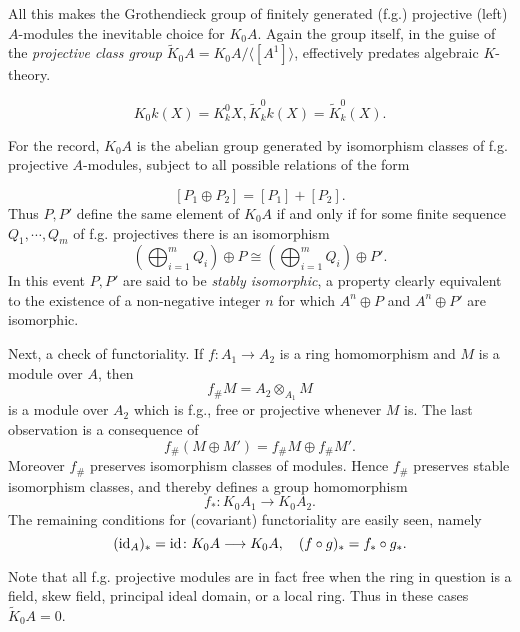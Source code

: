 All this makes the Grothendieck group of finitely generated (f.g.) projective (left) $A$-modules the inevitable choice for $K_0A$. Again the group itself, in the guise of the {\em projective class group}
$\widetilde{K}_0A=K_0A/\langle [A^1] \rangle$, effectively predates algebraic $K$-theory.
\begin{corollary}
$$K_0k(X)=K_k^0X,\widetilde{K}_k^0k(X)=\widetilde{K}_k^0(X).$$
\end{corollary}

For the record, $K_0A$ is the abelian group generated by isomorphism classes of f.g. projective $A$-modules, subject to all possible relations of the form

$$[P_1\oplus P_2]=[P_1]+[P_2].$$
Thus $P,P'$ define the same element of $K_0A$ if and only if for some finite sequence $Q_1,\cdots,Q_m$ of f.g. projectives there is an isomorphism
\[(\bigoplus_{i=1}^m Q_i)\oplus P \cong (\bigoplus_{i=1}^m Q_i)\oplus P' .\]
In this event $P,P'$ are said to be {\em stably isomorphic}, a property clearly equivalent to the existence of a non-negative integer $n$ for which $A^n\oplus P$ and $A^n\oplus P'$ are isomorphic.

Next, a check of functoriality. If $f\colon  A_1\longrightarrow A_2$ is a ring homomorphism and $M$ is a module over $A$, then
$$f_\#M=A_2\otimes_{A_1}M$$
is a module over $A_2$ which is f.g., free or projective whenever $M$ is. The last observation is a consequence of
$$f_\#(M\oplus M')=f_\#M\oplus f_\# M'.$$
Moreover $f_\#$ preserves isomorphism classes of modules. Hence $f_\#$ preserves stable isomorphism classes, and thereby defines a group homomorphism
$$f_*\colon  K_0A_1 \longrightarrow K_0A_2 .$$
The remaining conditions for (covariant) functoriality are easily seen, namely
$$(\mathrm{id}_A)_*=\mathrm{id}\colon  K_0A\longrightarrow K_0A,\quad (f\circ g)_*=f_*\circ g_*.$$

Note that all f.g. projective modules are in fact free when the ring in question is a field, skew field, principal ideal domain, or a local ring. Thus in these cases $\widetilde{K}_0A=0$.